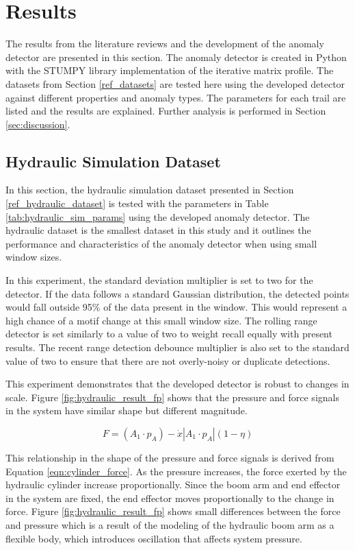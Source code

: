 \section{Results}
\label{ref_results}

The results from the literature reviews and the development of the anomaly detector are presented in this section.
The anomaly detector is created in Python with the STUMPY library implementation of the iterative matrix profile.
The datasets from Section \ref{ref_datasets} are tested here using the developed detector against different properties and anomaly types.
The parameters for each trail are listed and the results are explained.
Further analysis is performed in Section \ref{sec:discussion}.

\subsection{Hydraulic Simulation Dataset}
\label{ref_results_hydraulic_sim}
In this section, the hydraulic simulation dataset presented in Section \ref{ref_hydraulic_dataset} is tested  with the parameters in Table \ref{tab:hydraulic_sim_params} using the developed anomaly detector.
The hydraulic dataset is the smallest dataset in this study and it outlines the performance and characteristics of the anomaly detector when using small window sizes.

In this experiment, the standard deviation multiplier is set to two for the detector.
If the data follows a standard Gaussian distribution, the detected points would fall outside 95\% of the data present in the window.
This would represent a high chance of a motif change at this small window size.
The rolling range detector is set similarly to a value of two to weight recall equally with present results.
The recent range detection debounce multiplier is also set to the standard value of two to ensure that there are not overly-noisy or duplicate detections.

This experiment demonstrates that the developed detector is robust to changes in scale.
Figure \ref{fig:hydraulic_result_fp} shows that the pressure and force signals in the system have similar shape but different magnitude. 

\begin{equation}
    \label{eqn:cylinder_force}
    F = (A_1 \cdot p_A) - \dot{x}  | A_1 \cdot p_A | (1 - \eta)
\end{equation}

This relationship in the shape of the pressure and force signals is derived from Equation \ref{eqn:cylinder_force}.
As the pressure increases, the force exerted by the hydraulic cylinder increase proportionally.
Since the boom arm and end effector in the system are fixed, the end effector moves proportionally to the change in force.
Figure \ref{fig:hydraulic_result_fp} shows small differences between the force and pressure which is a result of the modeling of the hydraulic boom arm as a flexible body, which introduces oscillation that affects system pressure.


